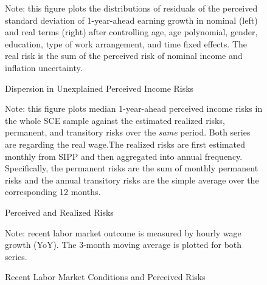         \begin{figure}[!ht]
    \caption{Dispersion in Unexplained Perceived Income Risks}
    \label{fig:histmoms}
	\begin{center}
\end{center}
    \begin{flushleft}Note: this figure plots the distributions of residuals of the perceived standard deviation of 1-year-ahead earning growth in nominal (left) and real terms (right) after controlling age, age polynomial, gender, education, type of work arrangement, and time fixed effects. The real risk is the sum of the perceived risk of nominal income and inflation uncertainty.\end{flushleft}
    \end{figure}
    
    \clearpage
    
    \begin{figure}[!ht]
    	\caption{Perceived and Realized Risks}
    	\label{fig:ts_compare}
    	\begin{center}
    		\vbiskip
    	\vbiskip
    	\end{center}
    \begin{flushleft}Note: this figure plots median 1-year-ahead perceived income risks in the whole SCE sample against the estimated realized risks, permanent, and transitory risks over the \emph{same} period. Both series are regarding the real wage.The realized risks are first estimated monthly from SIPP and then aggregated into annual frequency. Specifically, the permanent risks are the sum of monthly permanent risks and the annual transitory risks are the simple average over the corresponding 12 months.\end{flushleft}
    \end{figure}
    
  
    \clearpage
    \begin{figure}[!ht]
      \caption{Recent Labor Market Conditions and Perceived Risks}
    \label{fig:ts_he}
    	\begin{center}
    \end{center}
    \begin{flushleft}Note: recent labor market outcome is measured by hourly wage growth (YoY). The 3-month moving average is plotted for both series.\end{flushleft}
    \end{figure}
    
